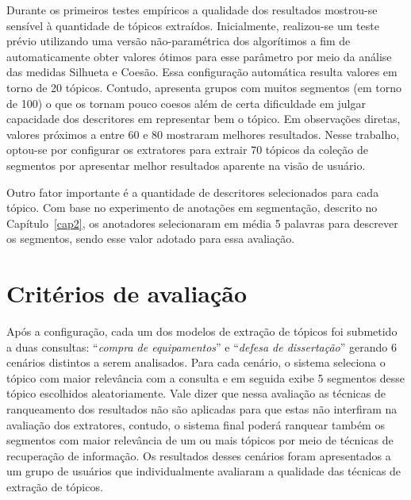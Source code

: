 Durante os primeiros testes empíricos a qualidade dos resultados mostrou-se sensível à quantidade de tópicos extraídos.
Inicialmente, realizou-se um teste prévio utilizando uma versão não-paramétrica dos algorítimos a fim de automaticamente obter valores ótimos para esse parâmetro por meio da análise das medidas Silhueta e Coesão. Essa configuração automática resulta valores em torno de 20 tópicos. Contudo, apresenta grupos com muitos segmentos (em torno de 100) o que os tornam pouco coesos além de certa dificuldade em julgar capacidade dos descritores em representar bem o tópico.  
Em observações diretas, valores próximos a entre 60 e 80 mostraram melhores resultados. Nesse trabalho, optou-se por configurar os extratores para extrair 70 tópicos da coleção de segmentos por apresentar melhor resultados aparente na visão de usuário.

Outro fator importante é a quantidade de descritores selecionados para cada tópico. Com base no experimento de anotações em segmentação, descrito no Capítulo~\ref{cap2}, os anotadores selecionaram em média 5 palavras para descrever os segmentos, sendo esse valor adotado para essa avaliação.




\section{Critérios de avaliação}


Após a configuração, cada um dos modelos de extração de tópicos foi submetido a duas consultas: ``\textit{compra de equipamentos}'' e ``\textit{defesa de dissertação}'' gerando 6 cenários distintos a serem analisados. 
Para cada cenário, o sistema seleciona o tópico com maior relevância com a consulta e em seguida exibe 5 segmentos desse tópico escolhidos aleatoriamente. 
Vale dizer que nessa avaliação as técnicas de ranqueamento dos resultados não são aplicadas para que estas não interfiram na avaliação dos extratores, contudo, o sistema final poderá ranquear também os segmentos com maior relevância de um ou mais tópicos por meio de técnicas de recuperação de informação. 
Os resultados desses cenários foram apresentados a um grupo de usuários que individualmente avaliaram a qualidade das técnicas de extração de tópicos. 
%

